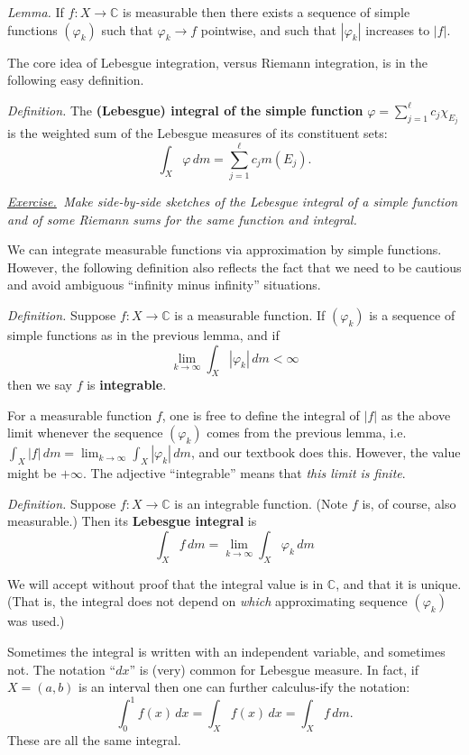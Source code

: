 \documentclass[12pt]{article}
\newcommand{\CC}{\mathbb{C}}
\newcommand{\defin}{\emph{Definition.}\,\,}
\newcommand{\lem}{\emph{Lemma.}\,\,}
\newcommand{\exer}[2]{\emph{\underline{Exercise.}\, #2} \vspace*{#1mm}}
\begin{document}
\lem If $f:X\to \CC$ is measurable then there exists a sequence of simple functions $(\varphi_k)$ such that $\varphi_k \to f$ pointwise, and such that $|\varphi_k|$ increases to $|f|$.

The core idea of Lebesgue integration, versus Riemann integration, is in the following easy definition.

\defin The \textbf{(Lebesgue) integral of the simple function} $\varphi = \sum_{j=1}^\ell c_j \chi_{E_j}$ is the weighted sum of the Lebesgue measures of its constituent sets:
	$$\boxed{\int_X \varphi\,dm = \sum_{j=1}^\ell c_j m(E_j)}.$$

\clearpage\newpage
\exer{50}{Make side-by-side sketches of the Lebesgue integral of a simple function and of some Riemann sums for the same function and integral.}

We can integrate measurable functions via approximation by simple functions.  However, the following definition also reflects the fact that we need to be cautious and avoid ambiguous ``infinity minus infinity'' situations.

\defin Suppose $f:X\to\CC$ is a measurable function.  If $(\varphi_k)$ is a sequence of simple functions as in the previous lemma, and if
    $$\lim_{k\to\infty} \int_X |\varphi_k|\,dm < \infty$$
then we say $f$ is \textbf{integrable}.

For a measurable function $f$, one is free to define the integral of $|f|$ as the above limit whenever the sequence $(\varphi_k)$ comes from the previous lemma, i.e.~$\int_X |f|\,dm = \lim_{k\to\infty} \int_X |\varphi_k|\,dm$, and our textbook does this.  However, the value might be $+\infty$.  The adjective ``integrable'' means that \emph{this limit is finite}.

\defin Suppose $f:X\to\CC$ is an integrable function.  (Note $f$ is, of course, also measurable.)  Then its \textbf{Lebesgue integral} is
    $$\boxed{\int_X f\,dm = \lim_{k\to\infty} \int_X \varphi_k\,dm}$$

We will accept without proof that the integral value is in $\CC$, and that it is unique.  (That is, the integral does not depend on \emph{which} approximating sequence $(\varphi_k)$ was used.)

Sometimes the integral is written with an independent variable, and sometimes not.  The notation ``$dx$'' is (very) common for Lebesgue measure.  In fact, if $X=(a,b)$ is an interval then one can further calculus-ify the notation:
    	$$\int_0^1 f(x)\,dx = \int_X f(x)\,dx = \int_X f\,dm.$$
These are all the same integral.
\end{document}
